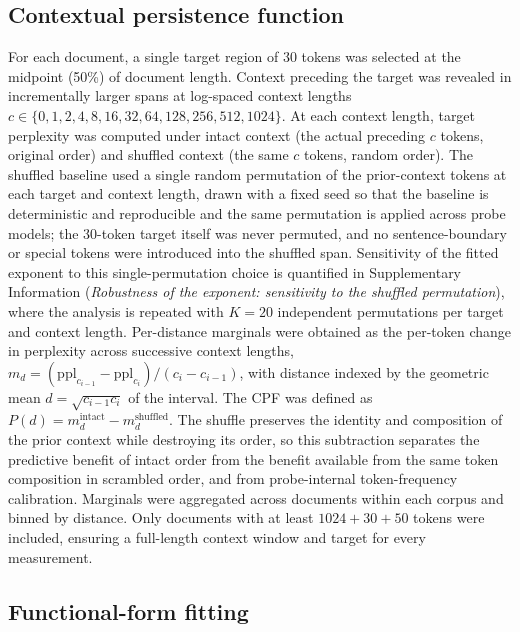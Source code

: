 \documentclass[11pt]{article}
\begin{document}
\subsection{Contextual persistence function}

For each document, a single target region of 30 tokens was selected at the midpoint (50\%) of
document length. Context preceding the target was revealed in incrementally larger spans at
log-spaced context lengths $c \in \{0, 1, 2, 4, 8, 16, 32, 64, 128, 256, 512, 1024\}$. At each
context length, target perplexity was computed under intact context (the actual preceding $c$
tokens, original order) and shuffled context (the same $c$ tokens, random order). The shuffled
baseline used a single random permutation of the prior-context tokens at each target and context
length, drawn with a fixed seed so that the baseline is deterministic and reproducible and the same
permutation is applied across probe models; the 30-token target itself was never permuted, and no
sentence-boundary or special tokens were introduced into the shuffled span. Sensitivity of the
fitted exponent to this single-permutation choice is quantified in Supplementary Information
(\emph{Robustness of the exponent: sensitivity to the shuffled permutation}), where the analysis is
repeated with $K=20$ independent permutations per target and context length. Per-distance
marginals were obtained as the per-token change in perplexity across successive context lengths,
$m_d = (\mathrm{ppl}_{c_{i-1}} - \mathrm{ppl}_{c_i}) / (c_i - c_{i-1})$, with distance indexed by
the geometric mean $d = \sqrt{c_{i-1} c_i}$ of the interval. The CPF was defined
as $P(d) = m_d^{\text{intact}} - m_d^{\text{shuffled}}$. The shuffle preserves the identity and
composition of the prior context while destroying its order, so this subtraction separates the
predictive benefit of intact order from the benefit available from the same token composition in
scrambled order, and from probe-internal token-frequency calibration. Marginals were aggregated across
documents within each corpus and binned by distance. Only documents with at least
$1024 + 30 + 50$ tokens were included, ensuring a full-length context window and target for every
measurement.

\subsection{Functional-form fitting}
\end{document}
